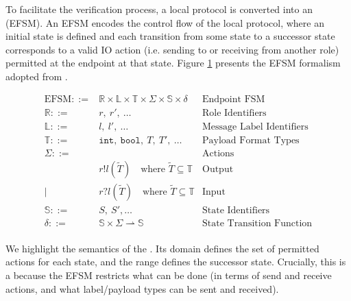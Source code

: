 To facilitate the verification process, a local protocol is converted into 
an  (EFSM). An EFSM encodes the control flow of the local protocol, where an initial state is defined and each transition from some state to a successor state corresponds to a valid IO action (i.e. sending to or receiving from another role) permitted at the endpoint at that state. Figure \ref{fig:efsmsyntax} presents the EFSM formalism adopted from \cite{Hybrid2016}.

\begin{figure}[!hb]
\doublespacing
\[
\begin{array}{rlr}

\text{EFSM} ::= & \mathbb{R} \times \mathbb{L} \times \mathbb{T} \times \Sigma \times \mathbb{S} \times \delta & \text{Endpoint FSM} \\

\mathbb{R} ::= & r,~r',~\dots & \text{Role Identifiers} \\

\mathbb{L} ::= & l,~l',~\dots & \text{Message Label Identifiers} \\

\mathbb{T} ::= & \texttt{int},~\texttt{bool},~T,~T',~\dots & \text{Payload Format Types} \\

\Sigma ::= & & \text{Actions} \\
     & r!l(\tilde{T}) \quad \text{where } \tilde{T} \subseteq \mathbb{T} & \text{Output} \\
\mid & r?l(\tilde{T}) \quad \text{where } \tilde{T} \subseteq \mathbb{T} & \text{Input} \\

\mathbb{S} ::= & S,~S',\dots & \text{State Identifiers} \\

\delta ::= & \mathbb{S} \times \Sigma \rightharpoonup \mathbb{S} & \text{State Transition Function} \\

\end{array}
\]
\singlespacing
{}
\label{fig:efsmsyntax}
\end{figure}

We highlight the semantics of the . Its domain defines the set of permitted actions for each state, and the range defines the successor state. Crucially, this is a  because the EFSM restricts what can be done (in terms of send and receive actions, and what label/payload types can be sent and received). 

